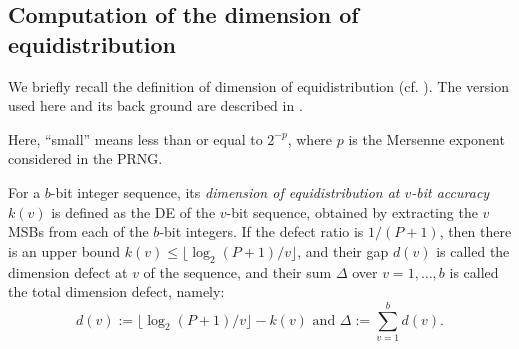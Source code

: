 \documentclass{svmult}
\def\bbf2{\ifmmode\mathbb{F}_2\else$\mathbb{F}_2$\fi}%
\begin{document}
\subsection{Computation of the dimension of equidistribution}
\label{sec:DE}
We briefly recall the definition of dimension of 
equidistribution (cf. \cite{CLT}\cite{COMBTAUS}\cite{SFMT}).
The version used here and its back ground are described in \cite{SFMT}. 
Here, ``small'' means less than or equal to $2^{-p}$, where $p$ 
is the Mersenne exponent considered in the PRNG. 

For a $b$-bit integer sequence, its {\em dimension of 
equidistribution at $v$-bit accuracy} $k(v)$
is defined as the DE of the $v$-bit sequence, obtained by extracting
the $v$ MSBs from each of the $b$-bit integers.
If the defect ratio is $1/(P+1)$, 
then there is an upper bound 
$k(v) \leq \lfloor \log_2 (P+1) / v \rfloor$,
and their gap $d(v)$ is 
called the dimension defect at $v$ of the sequence,
and their sum $\Delta$ over $v=1,\ldots,b$ is called
the total dimension defect, namely: 
\[
d(v):=\lfloor \log_2 (P+1) / v \rfloor -k(v) 
\mbox{ and } \Delta:=\sum_{v=1}^b d(v).
\]
\end{document}
